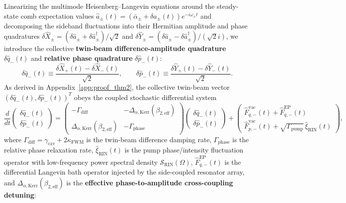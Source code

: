 \documentclass[11pt,letterpaper]{article}
\theoremstyle{definition}
\theoremstyle{remark}
\begin{document}
Linearizing the multimode Heisenberg--Langevin equations around the steady-state comb expectation values $\hat{a}_\pm(t) = (\bar{\alpha}_\pm + \delta\hat{a}_\pm(t))e^{-i\omega_\pm t}$ and decomposing the sideband fluctuations into their Hermitian amplitude and phase quadratures $\delta\hat{X}_\pm = (\delta\hat{a}_\pm + \delta\hat{a}_\pm^\dagger)/\sqrt{2}$ and $\delta\hat{Y}_\pm = (\delta\hat{a}_\pm - \delta\hat{a}_\pm^\dagger)/(\sqrt{2}i)$, we introduce the collective \textbf{twin-beam difference-amplitude quadrature} $\delta\hat{q}_-(t)$ and \textbf{relative phase quadrature} $\delta\hat{p}_-(t)$:
\begin{equation}
\delta\hat{q}_-(t) \equiv \frac{\delta\hat{X}_+(t) - \delta\hat{X}_-(t)}{\sqrt{2}}, \qquad \delta\hat{p}_-(t) \equiv \frac{\delta\hat{Y}_+(t) - \delta\hat{Y}_-(t)}{\sqrt{2}}.
\label{eq:quadrature_defs}
\end{equation}
As derived in Appendix~\ref{app:proof_thm2}, the collective twin-beam vector $(\delta\hat{q}_-(t), \delta\hat{p}_-(t))^T$ obeys the coupled stochastic differential system
\begin{equation}
\frac{d}{dt}\begin{pmatrix} \delta\hat{q}_-(t) \\ \delta\hat{p}_-(t) \end{pmatrix} = \begin{pmatrix} -\Gamma_{\mathrm{diff}} & -\Delta_{\alpha,\mathrm{Kerr}}(\beta_{2,\mathrm{eff}}) \\ \Delta_{\alpha,\mathrm{Kerr}}(\beta_{2,\mathrm{eff}}) & -\Gamma_{\mathrm{phase}} \end{pmatrix}\begin{pmatrix} \delta\hat{q}_-(t) \\ \delta\hat{p}_-(t) \end{pmatrix} + \begin{pmatrix} \hat{F}_{q,-}^{\mathrm{vac}}(t) + \hat{F}_{q,-}^{\mathrm{EP}}(t) \\ \hat{F}_{p,-}^{\mathrm{vac}}(t) + \sqrt{\Gamma_{\mathrm{pump}}}\,\hat{\xi}_{\mathrm{RIN}}(t) \end{pmatrix},
\label{eq:hl_drift_matrix}
\end{equation}
where $\Gamma_{\mathrm{diff}} = \gamma_{\mathrm{cav}} + 2\kappa_{\mathrm{FWM}}$ is the twin-beam difference damping rate, $\Gamma_{\mathrm{phase}}$ is the relative phase relaxation rate, $\hat{\xi}_{\mathrm{RIN}}(t)$ is the pump phase/intensity fluctuation operator with low-frequency power spectral density $\mathcal{S}_{\mathrm{RIN}}(\Omega)$, $\hat{F}_{q,-}^{\mathrm{EP}}(t)$ is the differential Langevin bath operator injected by the side-coupled resonator array, and $\Delta_{\alpha,\mathrm{Kerr}}(\beta_{2,\mathrm{eff}})$ is the \textbf{effective phase-to-amplitude cross-coupling detuning}:
\end{document}
